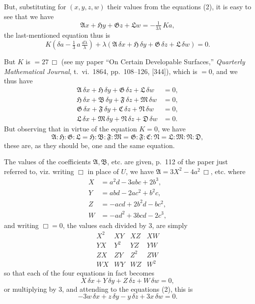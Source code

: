 \documentclass[11pt]{article}
\begin{document}
But, substituting for $(x,y,z,w)$ their values from the equations (2), it is easy to see that we have
\[ \mathfrak{A}x + \mathfrak{H}y + \mathfrak{G}z + \mathfrak{L}w = -\tfrac{1}{3\lambda}\,Ka, \]
the last-mentioned equation thus is
\[ K(\delta a - \tfrac{1}{3}\,a\,\tfrac{d\lambda}{\lambda}) + \lambda(\mathfrak{A}\,\delta x + \mathfrak{H}\,\delta y + \mathfrak{G}\,\delta z + \mathfrak{L}\,\delta w) = 0. \]

But $K$ is $= 27\,\Box$ (see my paper ``On Certain Developable Surfaces,'' \emph{Quarterly Mathematical Journal}, t.~vi.~1864, pp.~108--126, [344]), which is $= 0$, and we thus have
\begin{align*}
\mathfrak{A}\,\delta x + \mathfrak{H}\,\delta y + \mathfrak{G}\,\delta z + \mathfrak{L}\,\delta w &= 0,\\
\mathfrak{H}\,\delta x + \mathfrak{B}\,\delta y + \mathfrak{F}\,\delta z + \mathfrak{M}\,\delta w &= 0,\\
\mathfrak{G}\,\delta x + \mathfrak{F}\,\delta y + \mathfrak{C}\,\delta z + \mathfrak{N}\,\delta w &= 0,\\
\mathfrak{L}\,\delta x + \mathfrak{M}\,\delta y + \mathfrak{N}\,\delta z + \mathfrak{D}\,\delta w &= 0.
\end{align*}
But observing that in virtue of the equation $K = 0$, we have
\[ \mathfrak{A}:\mathfrak{H}:\mathfrak{G}:\mathfrak{L} = \mathfrak{H}:\mathfrak{B}:\mathfrak{F}:\mathfrak{M} = \mathfrak{G}:\mathfrak{F}:\mathfrak{C}:\mathfrak{N} = \mathfrak{L}:\mathfrak{M}:\mathfrak{N}:\mathfrak{D}, \]
these are, as they should be, one and the same equation.

The values of the coefficients $\mathfrak{A},\mathfrak{B}$, etc. are given, p.~112 of the paper just referred to, viz. writing $\Box$ in place of $U$, we have $\mathfrak{A} = 3X^2 - 4a^2\,\Box$, etc. where
\begin{align*}
X &= a^2 d - 3abc + 2b^3,\\
Y &= abd - 2ac^2 + b^2 c,\\
Z &= -acd + 2b^2 d - bc^2,\\
W &= -ad^2 + 3bcd - 2c^3,
\end{align*}
and writing $\Box = 0$, the values each divided by $3$, are simply
\[ \begin{matrix} X^2 & XY & XZ & XW \\ YX & Y^2 & YZ & YW \\ ZX & ZY & Z^2 & ZW \\ WX & WY & WZ & W^2 \end{matrix} \]
so that each of the four equations in fact becomes
\[ X\,\delta x + Y\,\delta y + Z\,\delta z + W\,\delta w = 0, \]
or multiplying by $3$, and attending to the equations (2), this is
\[ -3w\,\delta x + z\,\delta y - y\,\delta z + 3x\,\delta w = 0. \]
\end{document}
